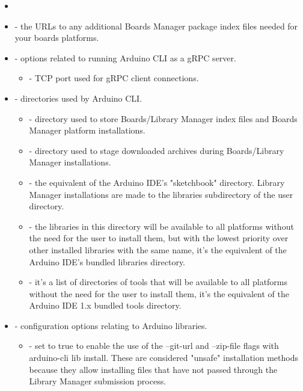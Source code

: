 \begin{itemize}
    \item {}
    \item {} - the URLs to any additional Boards Manager package index files needed for your boards platforms.
    \item {} - options related to running Arduino CLI as a gRPC server.
    \begin{itemize}
        \item {} - TCP port used for gRPC client connections.
    \end{itemize}
    \item {} - directories used by Arduino CLI.
    \begin{itemize}
        \item {} - directory used to store Boards/Library Manager index files and Boards Manager platform installations.
        \item {} - directory used to stage downloaded archives during Boards/Library Manager installations.
        \item {} - the equivalent of the Arduino IDE's "sketchbook" directory. Library Manager installations are made to the libraries subdirectory of the user directory.
        \item {} - the libraries in this directory will be available to all platforms without the need for the user to install them, but with the lowest priority over other installed libraries with the same name, it's the equivalent of the Arduino IDE's bundled libraries directory.
        \item {} - it's a list of directories of tools that will be available to all platforms without the need for the user to install them, it's the equivalent of the Arduino IDE 1.x bundled tools directory.
    \end{itemize}
    \item {} - configuration options relating to Arduino libraries.
    \begin{itemize}
        \item {} - set to true to enable the use of the --git-url and --zip-file flags with arduino-cli lib install. These are considered "unsafe" installation methods because they allow installing files that have not passed through the Library Manager submission process.
    \end{itemize}

\end{itemize}
